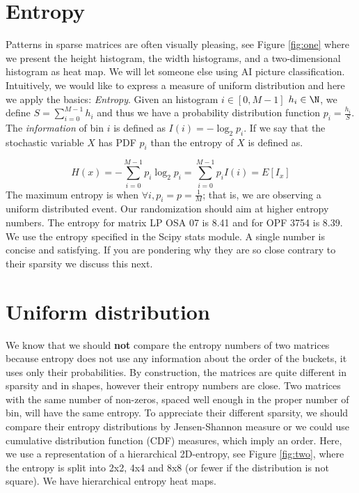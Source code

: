 \documentclass[acmsmall]{acmart}
\begin{document}
\section{Entropy}
\label{sec:entropy}
Patterns in sparse matrices are often visually pleasing, see Figure
\ref{fig:one} where we present the height histogram, the width
histograms, and a two-dimensional histogram as heat map. We will let
someone else using AI picture classification. Intuitively, we would
like to express a measure of uniform distribution and here we apply
the basics: {\em Entropy}. Given an histogram $i\in[0,M-1]$ $h_i \in
\N$, we define $S =\sum_{i=0}^{M-1}h_i$ and thus we have a probability
distribution function $p_i = \frac{h_i}{S}$. The {\em information} of
bin $i$ is defined as $I(i) = -\log_2 p_i$. If we say that the
stochastic variable $X$ has PDF $p_i$ than the entropy of $X$ is
defined as.

\begin{equation}
  \label{eq:entropy}
  H(x) = -\sum_{i=0}^{M-1} p_i\log_2p_i = \sum_{i=0}^{M-1}p_i I(i) =
  E[I_x]
\end{equation}
The maximum entropy is when $\forall i, p_i = p = \frac{1}{M}$; that
is, we are observing a uniform distributed event.  Our
randomization should aim at higher entropy numbers. The entropy for
matrix LP OSA 07 is 8.41 and for OPF 3754 is 8.39. We use the entropy
specified in the Scipy stats module.  A single number is concise and
satisfying. If you are pondering why they are so close contrary to
their sparsity we discuss this next.


\section{Uniform distribution}
\label{sec:uniform}
We know that we should {\bf not} compare the entropy numbers of two
matrices because entropy does not use any information about the order
of the buckets, it uses only their probabilities. By construction, the
matrices are quite different in sparsity and in shapes, however their
entropy numbers are close.  Two matrices with the same number of
non-zeros, spaced well enough in the proper number of bin, will have
the same entropy. To appreciate their different sparsity, we should
compare their entropy distributions by Jensen-Shannon measure
\cite{dalberto2012nonparametric} or we could use cumulative
distribution function (CDF) measures, which imply an order. Here, we
use a representation of a hierarchical 2D-entropy, see Figure
\ref{fig:two}, where the entropy is split into 2x2, 4x4 and 8x8 (or
fewer if the distribution is not square). We have hierarchical entropy
heat maps.
\end{document}
